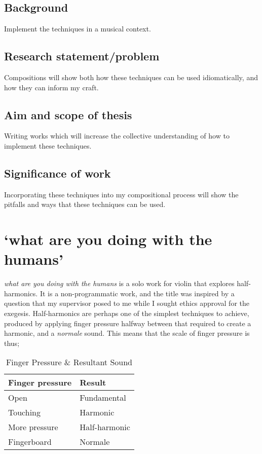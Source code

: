 \subsection{Background}
Implement the techniques in a musical context.
\subsection{Research statement/problem}
Compositions will show both how these techniques can be used idiomatically, and how they can inform my craft.
\subsection{Aim and scope of thesis}
Writing works which will increase the collective understanding of how to implement these techniques.
\subsection{Significance of work}
Incorporating these techniques into my compositional process will show the pitfalls and ways that these techniques can be used.

\section{`what are you doing with the humans'}
\emph{what are you doing with the humans} is a solo work for violin that explores half-harmonics.
It is a non-programmatic work, and the title was inspired by a question that my supervisor posed to me while I sought ethics approval for the exegesis.
Half-harmonics are perhaps one of the simplest techniques to achieve, produced by applying finger pressure halfway between that required to create a harmonic, and a \emph{normale} sound.
This means that the scale of finger pressure is thus;

\begin{table}[]
    \centering
    \caption{Finger Pressure \& Resultant Sound}
    \label{tab:finger-pressure}
    \begin{tabular}{@{}ll@{}}
    \toprule
    Finger pressure & Result        \\ \midrule
    Open            & Fundamental   \\
    Touching        & Harmonic      \\
    More pressure   & Half-harmonic \\
    Fingerboard     & Normale       \\ \bottomrule
    \end{tabular}%
    \end{table}

